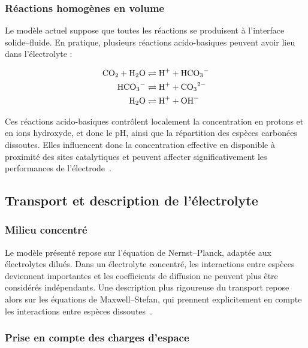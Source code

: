 \subsubsection*{Réactions homogènes en volume}

Le modèle actuel suppose que toutes les réactions se produisent à
l'interface solide--fluide. En pratique, plusieurs réactions acido-basiques
peuvent avoir lieu dans l'électrolyte :

\begin{align*}
\ce{CO2 + H2O} &\rightleftharpoons \ce{H+ + HCO3-} \\
\ce{HCO3-} &\rightleftharpoons \ce{H+ + CO3^{2-}} \\
\ce{H2O} &\rightleftharpoons \ce{H+ + OH-}
\end{align*}


Ces réactions acido-basiques contrôlent localement la concentration en
protons et en ions hydroxyde, et donc le pH, ainsi que la répartition des
espèces carbonées dissoutes. Elles influencent donc la concentration
effective en  disponible à proximité des sites catalytiques et
peuvent affecter significativement les performances de l'électrode~\cite{loffelholzModelingElectrochemicalCO2022}.
\subsection*{Transport et description de l'électrolyte}

\subsubsection*{Milieu concentré}

Le modèle présenté repose sur l'équation de Nernst--Planck, adaptée aux
électrolytes dilués. Dans un électrolyte concentré, les interactions
entre espèces deviennent importantes et les coefficients de diffusion
ne peuvent plus être considérés indépendants. Une description plus
rigoureuse du transport repose alors sur les équations de
Maxwell--Stefan, qui prennent explicitement en compte les interactions
entre espèces dissoutes~\cite{psaltisComparisonNernstPlanckMaxwellStefan2010, newmanElectrochemicalSystems}.

\subsubsection*{Prise en compte des charges d'espace}


